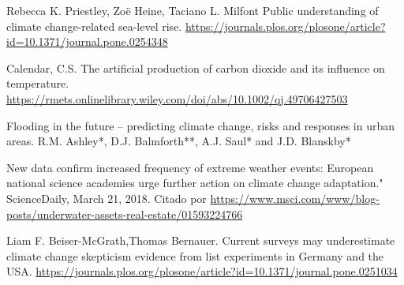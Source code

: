 \documentclass[12pt]{article}
\begin{document}
\item Rebecca K. Priestley, Zoë Heine, Taciano L. Milfont Public understanding of climate change-related sea-level rise. \url{https://journals.plos.org/plosone/article?id=10.1371/journal.pone.0254348}

\item Calendar, C.S. The artificial production of carbon dioxide and its influence on temperature. \url{https://rmets.onlinelibrary.wiley.com/doi/abs/10.1002/qj.49706427503}

\item Flooding in the future – predicting climate change, risks and responses in urban areas.	R.M. Ashley*, D.J. Balmforth**, A.J. Saul* and J.D. Blanskby*

\item New data confirm increased frequency of extreme weather events: European national science academies urge further action on climate change adaptation." ScienceDaily, March 21, 2018. Citado por
\url{https://www.msci.com/www/blog-posts/underwater-assets-real-estate/01593224766}

\item Liam F. Beiser-McGrath,Thomas Bernauer. Current surveys may underestimate climate change skepticism evidence from list experiments in Germany and the USA.
\url{https://journals.plos.org/plosone/article?id=10.1371/journal.pone.0251034}
\end{document}
